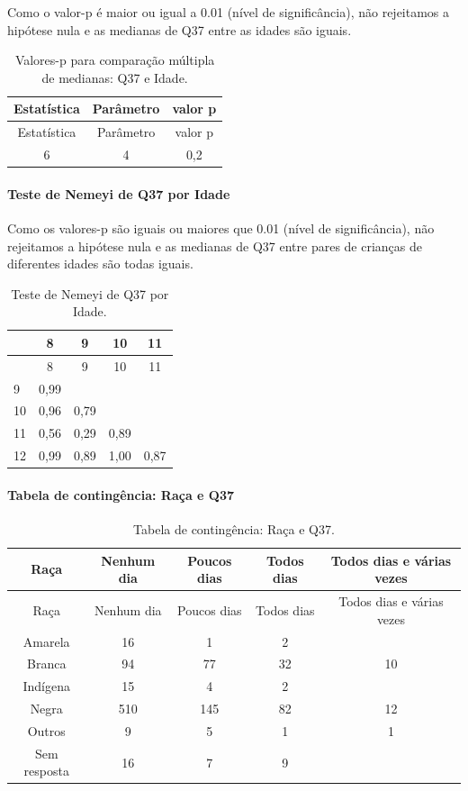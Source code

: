 \documentclass[]{article}
\let\oldparagraph\paragraph
\renewcommand{\paragraph}[1]{\oldparagraph{#1}\mbox{}}
\begin{document}
Como o valor-p é maior ou igual a 0.01 (nível de significância), não rejeitamos a hipótese nula e as medianas de Q37 entre as idades são iguais.

\begin{longtable}[]{@{}ccc@{}}
\caption{\label{tab:unnamed-chunk-1397}Valores-p para comparação múltipla de medianas: Q37 e Idade.}\tabularnewline
\toprule
Estatística & Parâmetro & valor p\tabularnewline
\midrule
\endfirsthead
\toprule
Estatística & Parâmetro & valor p\tabularnewline
\midrule
\endhead
6 & 4 & 0,2\tabularnewline
\bottomrule
\end{longtable}

\hypertarget{teste-de-nemeyi-de-q37-por-idade}{%
\paragraph{Teste de Nemeyi de Q37 por Idade}\label{teste-de-nemeyi-de-q37-por-idade}}

Como os valores-p são iguais ou maiores que 0.01 (nível de significância), não rejeitamos a hipótese nula e as medianas de Q37 entre pares de crianças de diferentes idades são todas iguais.

\begin{longtable}[]{@{}lcccc@{}}
\caption{\label{tab:unnamed-chunk-1399}Teste de Nemeyi de Q37 por Idade.}\tabularnewline
\toprule
& 8 & 9 & 10 & 11\tabularnewline
\midrule
\endfirsthead
\toprule
& 8 & 9 & 10 & 11\tabularnewline
\midrule
\endhead
9 & 0,99 & & &\tabularnewline
10 & 0,96 & 0,79 & &\tabularnewline
11 & 0,56 & 0,29 & 0,89 &\tabularnewline
12 & 0,99 & 0,89 & 1,00 & 0,87\tabularnewline
\bottomrule
\end{longtable}

\cleardoublepage

\hypertarget{tabela-de-continguxeancia-rauxe7a-e-q37}{%
\paragraph{Tabela de contingência: Raça e Q37}\label{tabela-de-continguxeancia-rauxe7a-e-q37}}

\begin{longtable}[]{@{}ccccc@{}}
\caption{\label{tab:unnamed-chunk-1400}Tabela de contingência: Raça e Q37.}\tabularnewline
\toprule
Raça & Nenhum dia & Poucos dias & Todos dias & Todos dias e várias vezes\tabularnewline
\midrule
\endfirsthead
\toprule
Raça & Nenhum dia & Poucos dias & Todos dias & Todos dias e várias vezes\tabularnewline
\midrule
\endhead
Amarela & 16 & 1 & 2 &\tabularnewline
Branca & 94 & 77 & 32 & 10\tabularnewline
Indígena & 15 & 4 & 2 &\tabularnewline
Negra & 510 & 145 & 82 & 12\tabularnewline
Outros & 9 & 5 & 1 & 1\tabularnewline
Sem resposta & 16 & 7 & 9 &\tabularnewline
\bottomrule
\end{longtable}
\end{document}
